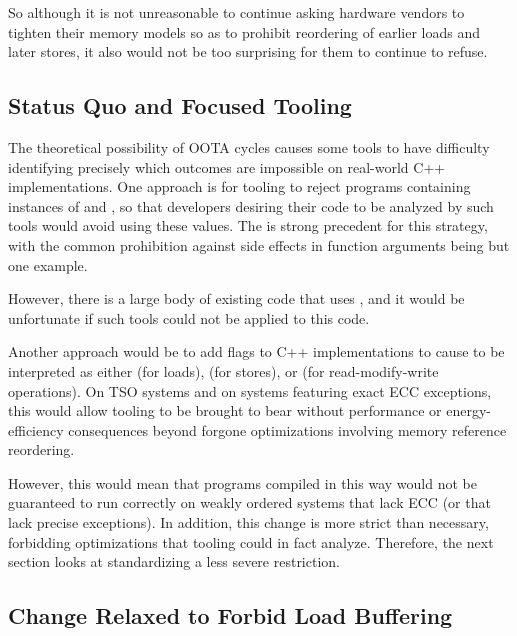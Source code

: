 \documentclass[10]{article}
\begin{document}
So although it is not unreasonable to continue asking hardware vendors
to tighten their memory models so as to prohibit reordering of earlier
loads and later stores, it also would not be too surprising for them to
continue to refuse.

\subsection{Status Quo and Focused Tooling}
\label{sec:Status Quo and Focused Tooling}

The theoretical possibility of OOTA cycles causes some tools to have
difficulty identifying precisely which outcomes are impossible on
real-world C++ implementations.
One approach is for tooling to reject programs containing instances
of  and , so that
developers desiring their code to be analyzed by such tools would
avoid using these  values.
The is strong precedent for this strategy, with the common prohibition
against side effects in function arguments being but one example.

However, there is a large body of existing code that uses
, and it would be unfortunate if such tools
could not be applied to this code.

Another approach would be to add flags to C++ implementations
to cause  to be interpreted as either
 (for loads),  (for
stores), or  (for read-modify-write operations).
On TSO systems and on systems featuring exact ECC exceptions, this
would allow tooling to be brought to bear without performance or
energy-efficiency consequences beyond forgone optimizations involving
memory reference reordering.

However, this would mean that programs compiled in this way would not
be guaranteed to run correctly on weakly ordered systems that lack
ECC (or that lack precise exceptions).
In addition, this change is more strict than necessary, forbidding
optimizations that tooling could in fact analyze.
Therefore, the next section looks at standardizing a less severe
restriction.

\subsection{Change Relaxed to Forbid Load Buffering}
\label{sec:Change Relaxed to Forbid Load Buffering}
\end{document}
